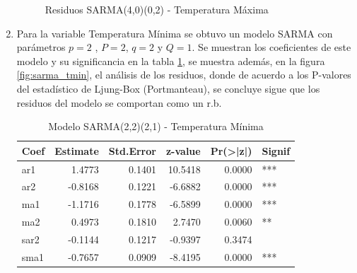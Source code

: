 \documentclass[12pt,oneside]{book}\usepackage[]{graphicx}\usepackage[]{color}
\newenvironment{knitrout}{}{} %
\theoremstyle{definition} %
\begin{document}
\begin{enumerate}
\begin{knitrout}
\begin{figure}[H]
{}

\caption{\label{fig:sarma_tmax} Residuos SARMA(4,0)(0,2) - Temperatura Máxima}\label{fig:unnamed-chunk-37}
\end{figure}


\end{knitrout}







\item Para la variable Temperatura Mínima se obtuvo un modelo SARMA con parámetros $p=2$ , $P=2$, $q=2$ y $Q=1$. Se muestran los coeficientes de este modelo y su significancia en la tabla \ref{tab:sarma_tmin}, se muestra además, en la figura \ref{fig:sarma_tmin}, el análisis de los residuos, donde de acuerdo a los P-valores del estadístico de Ljung-Box (Portmanteau), se concluye sigue que los residuos del modelo se comportan como un r.b.

\begin{knitrout}
\color{fgcolor}\begin{table}

\caption{\label{tab:model_x3}\label{tab:sarma_tmin}Modelo SARMA(2,2)(2,1) - Temperatura Mínima}
\centering
\begin{threeparttable}
\begin{tabular}[t]{lrrrrl}
\toprule
Coef & Estimate & Std.Error & z-value & Pr(>|z|) & Signif\\
\midrule
\rowcolor{gray!6}  ar1 & 1.4773 & 0.1401 & 10.5418 & 0.0000 & ***\\
ar2 & -0.8168 & 0.1221 & -6.6882 & 0.0000 & ***\\
\rowcolor{gray!6}  ma1 & -1.1716 & 0.1778 & -6.5899 & 0.0000 & ***\\
ma2 & 0.4973 & 0.1810 & 2.7470 & 0.0060 & **\\
\rowcolor{gray!6}  sar2 & -0.1144 & 0.1217 & -0.9397 & 0.3474 & \\
\addlinespace
sma1 & -0.7657 & 0.0909 & -8.4195 & 0.0000 & ***\\
\bottomrule
\end{tabular}
\end{threeparttable}
\end{table}



\end{knitrout}
\end{enumerate}
\end{document}
